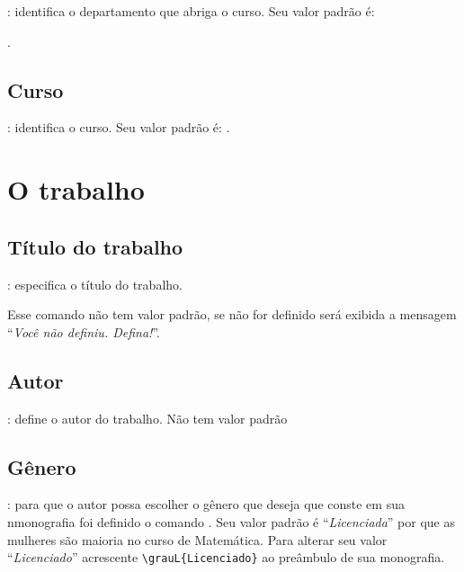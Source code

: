 : identifica o departamento que
abriga o curso. Seu valor padrão é:
\begin{center}
	.
\end{center}

\exemplo {}

\subsection{Curso}

: identifica o curso. Seu valor padrão é: .

\exemplo {}

\section{O trabalho}

\subsection{Título do trabalho}

: especifica o título do trabalho.

Esse comando não tem valor padrão, se não for definido será
exibida a mensagem ``\emph{Você não definiu. Defina!}''.

\exemplo {}

\subsection{Autor}

: define o autor do trabalho. Não tem valor padrão

\exemplo {}

\subsection{Gênero}

: para que o autor possa escolher o gênero que deseja que 
conste em sua nmonografia foi definido o comando . Seu valor padrão é ``\textit{Licenciada}'' por 
que as mulheres são maioria no curso de Matemática. Para alterar seu valor ``\textit{Licenciado}'' acrescente 
\verb|\grauL{Licenciado}| ao preâmbulo de sua monografia. 

